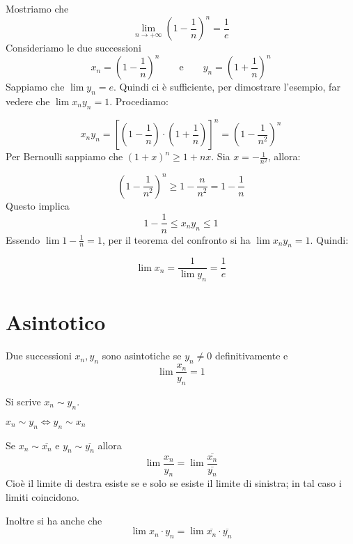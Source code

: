 \begin{example}
Mostriamo che 
\begin{equation*}
\lim_{n \to +\infty} \left(1-\frac{1}{n} \right)^n = \frac{1}{e}
\end{equation*}
Consideriamo le due successioni
\begin{equation*}
x_n = \left(1-\frac{1}{n} \right)^n \qquad \text{e} \qquad y_n = \left(1+\frac{1}{n} \right)^n
\end{equation*}
Sappiamo che $\lim y_n = e$. Quindi ci è sufficiente, per dimostrare l'esempio, far vedere che $\lim x_n y_n = 1$. Procediamo:

\begin{equation*}
x_ny_n = \left[\left(1-\frac{1}{n}\right) \cdot \left(1+\frac{1}{n}\right) \right]^n = \left(1-\frac{1}{n^2}\right)^n
\end{equation*}
Per Bernoulli sappiamo che $(1+x)^n \ge 1 + nx$. Sia $x = -\frac{1}{n^2}$, allora:

\begin{equation*}
\left(1-\frac{1}{n^2}\right)^n \ge 1 - \frac{n}{n^2} = 1 - \frac{1}{n}
\end{equation*}
Questo implica
\begin{equation*}
1 - \frac{1}{n} \le x_ny_n \le 1
\end{equation*}
Essendo $\lim 1 - \frac{1}{n} = 1$, per il teorema del confronto si ha $\lim x_ny_n =1$. Quindi:

\begin{equation*}
\lim x_n = \frac{1}{\lim y_n} = \frac{1}{e}
\end{equation*}

\end{example}

\section{Asintotico}
\begin{definition}
Due successioni $x_n, y_n$ sono asintotiche se $y_n \neq 0$ definitivamente e
\begin{equation*}
\lim \frac{x_n}{y_n} = 1
\end{equation*}

Si scrive $x_n \sim y_n$.
\end{definition}

\begin{remark}
$x_n \sim y_n \iff y_n \sim x_n$
\end{remark}

\begin{proposition}
Se $x_n \sim \overline{x_n}$ e $y_n \sim \overline{y_n}$  allora
\begin{equation*}
\lim \frac{x_n}{y_n} = \lim \frac{\overline{x_n}}{\overline{y_n}}
\end{equation*}
Cioè il limite di destra esiste se e solo se esiste il limite di sinistra; in tal caso i limiti coincidono.

Inoltre si ha anche che
\begin{equation*}
\lim x_n \cdot y_n = \lim \overline{x_n} \cdot \overline{y_n}
\end{equation*}
\end{proposition}


